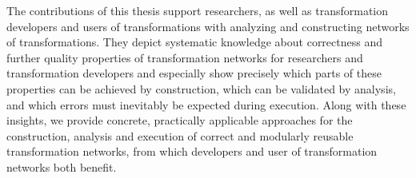 The contributions of this thesis support researchers, as well as transformation developers and users of transformations with analyzing and constructing networks of transformations.
They depict systematic knowledge about correctness and further quality properties of transformation networks for researchers and transformation developers and especially show precisely which parts of these properties can be achieved by construction, which can be validated by analysis, and which errors must inevitably be expected during execution. 
Along with these insights, we provide concrete, practically applicable approaches for the construction, analysis and execution of correct and modularly reusable transformation networks, from which developers and user of transformation networks both benefit.